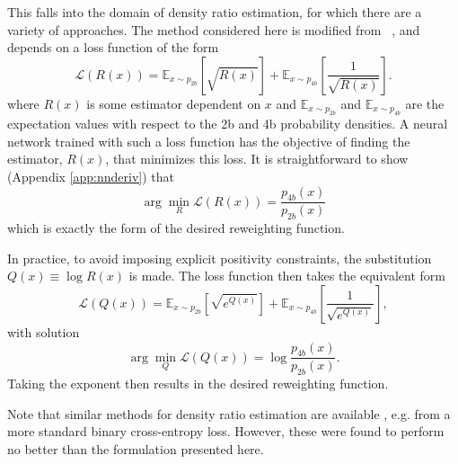 This falls into the domain of density ratio estimation, for which there are a variety
of approaches. The method considered here is modified from ~\cite{NNloss, NNloss1}, and depends on
a loss function of the form
\begin{equation}
\mathcal{L}(R(x)) = \mathbb{E}_{x\sim p_{2b}}[\sqrt{R(x)}]
+\mathbb{E}_{x\sim p_{4b}}[\frac{1}{\sqrt{R(x)}}].
\end{equation}
where $R(x)$ is some estimator dependent on $x$ and $\mathbb{E}_{x\sim p_{2b}}$ and 
$\mathbb{E}_{x\sim p_{4b}}$ are the expectation values with respect to the 2b and 4b probability 
densities. A neural network trained with such a loss function has the objective of finding
the estimator, $R(x)$, that minimizes this loss. It is straightforward to show
(Appendix \ref{app:nnderiv}) that
\begin{equation}
\arg \min_{R}\mathcal{L}(R(x)) = \frac{p_{4b}(x)}{p_{2b}(x)}
\end{equation}
which is exactly the form of the desired reweighting function.

In practice, to avoid imposing explicit positivity constraints, the substitution
$Q(x) \equiv \log R(x)$ is made. The loss function then takes the equivalent form
\begin{equation}
\mathcal{L}(Q(x)) = \mathbb{E}_{x\sim p_{2b}}[\sqrt{e^{Q(x)}}]
+\mathbb{E}_{x\sim p_{4b}}[\frac{1}{\sqrt{e^{Q(x)}}}],
\end{equation}
with solution
\begin{equation}
\arg \min_{Q}\mathcal{L}(Q(x)) = \log\frac{p_{4b}(x)}{p_{2b}(x)}.
\end{equation}
Taking the exponent then results in the desired reweighting function.

Note that similar methods for density ratio estimation are available ,
e.g. from a more standard binary cross-entropy loss. However, these were found to
perform no better than the formulation presented here.

